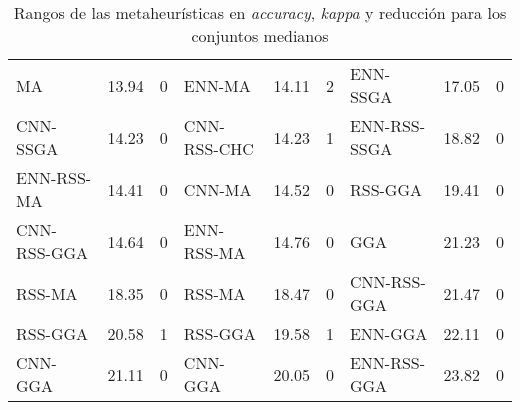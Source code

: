 \begin{table}[]
\begin{adjustbox}{max width =\textwidth}
\begin{tabular}{l c c|l c c|l c c}
MA           & 13.94 & 0 & ENN-MA       & 14.11 & 2 & ENN-SSGA     & 17.05 & 0 \\
CNN-SSGA     & 14.23 & 0 & CNN-RSS-CHC  & 14.23 & 1 & ENN-RSS-SSGA & 18.82 & 0 \\
ENN-RSS-MA   & 14.41 & 0 & CNN-MA       & 14.52 & 0 & RSS-GGA      & 19.41 & 0 \\
CNN-RSS-GGA  & 14.64 & 0 & ENN-RSS-MA   & 14.76 & 0 & GGA          & 21.23 & 0 \\
RSS-MA       & 18.35 & 0 & RSS-MA       & 18.47 & 0 & CNN-RSS-GGA  & 21.47 & 0 \\
RSS-GGA      & 20.58 & 1 & RSS-GGA      & 19.58 & 1 & ENN-GGA      & 22.11 & 0 \\
CNN-GGA      & 21.11 & 0 & CNN-GGA      & 20.05 & 0 & ENN-RSS-GGA  & 23.82 & 0 \\


\hline
\end{tabular}
\end{adjustbox}
\caption{Rangos de las metaheurísticas en \emph{accuracy}, \emph{kappa} y reducción para los conjuntos medianos}
\label{table-inits-rank}
\end{table} 

